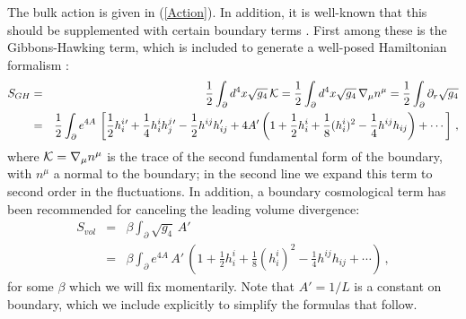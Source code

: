 \documentclass[a4paper,12pt]{article}
\begin{document}
The bulk action is given in (\ref{Action}).  In addition, it is
well-known that this should be supplemented with certain boundary
terms \cite{liutseytlin,frolov}.  First among these is the 
Gibbons-Hawking term, which is
included to generate a well-posed Hamiltonian formalism \cite{gh}:
\begin{eqnarray}
\label{ghterm}
S_{GH} &=& \frac{1}{2} \int_{\partial} d^4x \sqrt{g_4} \, {\cal K} =
\frac{1}{2} \int_{\partial} d^4x \sqrt{g_4} \, \nabla_{\mu} n^{\mu} =
\frac{1}{2} \int_{\partial} \partial_r \sqrt{g_4} \\ &=& \frac{1}{2}
\int_{\partial} e^{4A} \, \left[ \frac{1}{2} h^i_i{}' + \frac{1}{4} h^i_i
h^j_j{}' - \frac{1}{2} h^{ij} h_{ij}' + 4A' \left(1+ \frac{1}{2} h^i_i +
\frac{1}{8} (h^i_i)^2 - \frac{1}{4} h^{ij} h_{ij} \right) + \cdots
\right] \,, \nonumber 
\end{eqnarray}
where ${\cal K} = \nabla_{\mu} n^{\mu}$ is the trace of the second
fundamental form of the boundary, with $n^{\mu}$ a normal to the
boundary; in the second line we expand this term to second order in
the fluctuations.  In addition, a boundary cosmological term has been
recommended for canceling the leading volume divergence:
\begin{eqnarray}
\label{volume}
S_{vol} &=& \beta \int_{\partial} \sqrt{g_4} \, A' \\ &=& \beta
\int_{\partial} e^{4A} \, A' \, \left( 1 + \frac{1}{2} h^i_i +
\frac{1}{8} (h^i_i)^2 - \frac{1}{4} h^{ij} h_{ij} + \cdots \right) \,,
\end{eqnarray}
for some $\beta$ which we will fix momentarily.  Note that $A' = 1/L$
is a constant on boundary, which we include explicitly to simplify the
formulas that follow.
\end{document}
